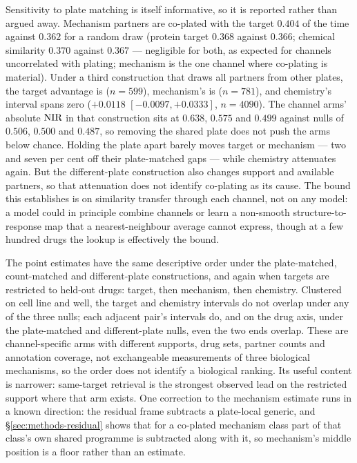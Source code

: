 Sensitivity to plate matching is itself informative, so it is reported rather than argued away.
Mechanism partners are co-plated with the target $0.404$ of the time against $0.362$ for a random
draw (protein target $0.368$ against $0.366$; chemical similarity $0.370$ against $0.367$ ---
negligible for both, as expected for channels uncorrelated with plating; mechanism is the one
channel where co-plating is material). Under a third construction that draws all partners from other
plates, the target advantage is  ($n = 599$), mechanism's is
 ($n = 781$), and chemistry's interval spans zero
($+0.0118$ \nolinebreak[3]$[-0.0097, +0.0333]$, $n = 4090$). The channel arms' absolute $\textrm{NIR}$ in
that construction sits at $0.638$, $0.575$ and $0.499$ against nulls of $0.506$, $0.500$ and
$0.487$, so removing the shared plate does not push the arms below chance. Holding the plate apart
barely moves target or mechanism --- two and seven per cent off their plate-matched gaps --- while
chemistry attenuates again. But the different-plate construction also changes support and available
partners, so that attenuation does not identify co-plating as its cause. The bound this establishes is on similarity transfer through each channel, not on any
model: a model could in principle combine channels or learn a non-smooth structure-to-response map
that a nearest-neighbour average cannot express, though at a few hundred drugs the lookup is
effectively the bound.

The point estimates have the same descriptive order under the plate-matched, count-matched and
different-plate constructions, and again when targets are restricted to held-out drugs: target,
then mechanism, then chemistry. Clustered on cell line and well, the target and chemistry intervals
do not overlap under any of the three nulls; each adjacent pair's intervals do, and on the drug axis,
under the plate-matched and different-plate nulls, even the two ends overlap. These are
channel-specific arms with different supports, drug sets, partner counts and annotation coverage,
not exchangeable measurements of three biological mechanisms, so the order does not identify a
biological ranking. Its useful content is narrower: same-target retrieval is the strongest observed
lead on the restricted support where that arm exists. One correction to the mechanism estimate runs
in a known direction: the residual frame subtracts a plate-local generic, and
\S\ref{sec:methods-residual} shows that for a co-plated mechanism class part of that class's own
shared programme is subtracted along with it, so mechanism's middle position is a floor rather than
an estimate.

